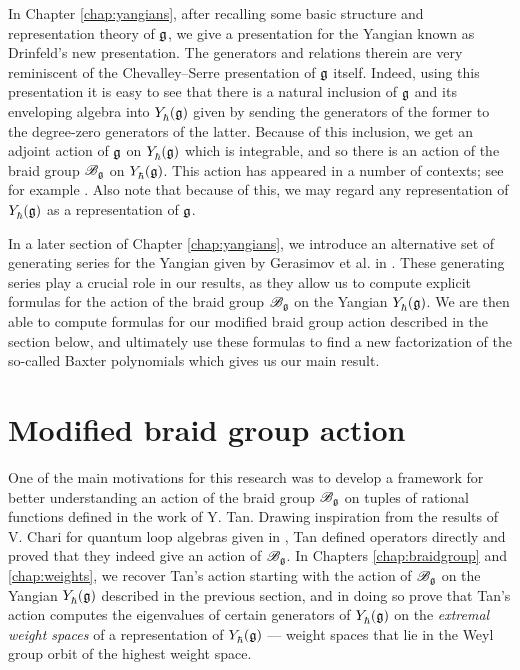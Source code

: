 In Chapter \ref{chap:yangians}, after recalling some basic structure and representation theory of $\mathfrak{g}$, we give a presentation for the Yangian known as Drinfeld's new presentation.
The generators and relations therein are very reminiscent of the Chevalley--Serre presentation of $\mathfrak{g}$ itself.
Indeed, using this presentation it is easy to see that there is a natural inclusion of $\mathfrak{g}$ and its enveloping algebra into $Y_\hbar^{}(\mathfrak{g})$ given by sending the generators of the former to the degree-zero generators of the latter.
Because of this inclusion, we get an adjoint action of $\mathfrak{g}$ on $Y_\hbar^{}(\mathfrak{g})$ which is integrable, and so there is an action of the braid group $\mathscr{B}_{\mathfrak{g}}$ on $Y_\hbar^{}(\mathfrak{g})$.
This action has appeared in a number of contexts; see for example \cite{guay_coproduct_2018, kodera_braid_2019, weekes_highest_2016}.
Also note that because of this, we may regard any representation of $Y_\hbar^{}(\mathfrak{g})$ as a representation of $\mathfrak{g}$.

In a later section of Chapter \ref{chap:yangians}, we introduce an alternative set of generating series for the Yangian given by Gerasimov et al. in \cite{gerasimov_class_2005}.
These generating series play a crucial role in our results, as they allow us to compute explicit formulas for the action of the braid group $\mathscr{B}_{\mathfrak{g}}$ on the Yangian $Y_\hbar^{}(\mathfrak{g})$.
We are then able to compute formulas for our modified braid group action described in the section below, and ultimately use these formulas to find a new factorization of the so-called Baxter polynomials which gives us our main result.


\section{Modified braid group action}

One of the main motivations for this research was to develop a framework for better understanding an action of the braid group $\mathscr{B}_{\mathfrak{g}}$ on tuples of rational functions defined in the work \cite{tan_braid_2015} of Y. Tan.
Drawing inspiration from the results of V. Chari for quantum loop algebras given in \cite{chari_braid_2002}, Tan defined operators directly and proved that they indeed give an action of $\mathscr{B}_{\mathfrak{g}}$.
In Chapters \ref{chap:braidgroup} and \ref{chap:weights}, we recover Tan's action starting with the action of $\mathscr{B}_{\mathfrak{g}}$ on the Yangian $Y_\hbar^{}(\mathfrak{g})$ described in the previous section, and in doing so prove that Tan's action computes the eigenvalues of certain generators of $Y_\hbar^{}(\mathfrak{g})$ on the \emph{extremal weight spaces} of a representation of $Y_\hbar^{}(\mathfrak{g})$ --- weight spaces that lie in the Weyl group orbit of the highest weight space.


